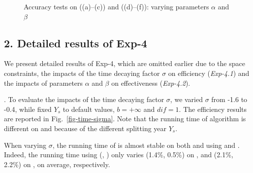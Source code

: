 \begin{figure}[tb!]
\begin{center}
\hspace{\graphmarginexpapp}
\end{center}
\vspace{-5ex}
\caption{\small Accuracy tests on \recom ((a)--(c)) and \fcita ((d)--(f)): varying parameters $\alpha$ and $\beta$}
\label{fig-ab}
\vspace{-3ex}
\end{figure}

\subsection*{2. Detailed results of Exp-4} %

We present detailed results of Exp-4, which are omitted earlier due to the space constraints, \ie the impacts of the time decaying factor $\sigma$  on efficiency  ({\em Exp-4.1}) and the impacts of parameters $\alpha$ and $\beta$ on effectiveness ({\em Exp-4.2}).

. To evaluate the impacts of the time decaying factor $\sigma$, we varied $\sigma$ from -1.6 to -0.4, while fixed $Y_s$ to default values, $b=+\infty$ and $dif=1$. The efficiency results are reported in Fig.~\ref{fig-time-sigma}.
Note that the running time of algorithm \batensemble is different on \recom and \fcita because of the different splitting year $Y_s$.

When varying $\sigma$, the running time of \batensemble is almost stable on both \aminer and \magdata using \fcita and \recom. Indeed, the running time using (\fcita, \recom) only varies (1.4\%, 0.5\%) on \aminer, and (2.1\%, 2.2\%) on \magdata, on average, respectively.


